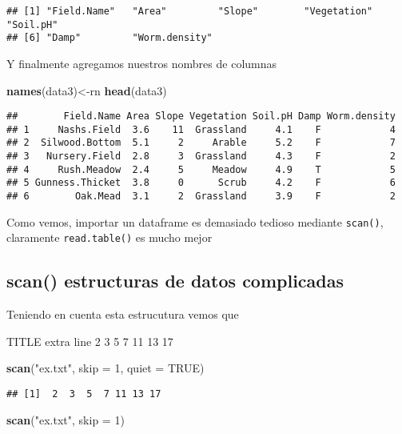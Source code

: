 \documentclass[]{article}
\newenvironment{Shaded}{\begin{snugshade}}{\end{snugshade}}
\newcommand{\KeywordTok}[1]{\textcolor[rgb]{0.13,0.29,0.53}{\textbf{#1}}}
\newcommand{\DataTypeTok}[1]{\textcolor[rgb]{0.13,0.29,0.53}{#1}}
\newcommand{\DecValTok}[1]{\textcolor[rgb]{0.00,0.00,0.81}{#1}}
\newcommand{\StringTok}[1]{\textcolor[rgb]{0.31,0.60,0.02}{#1}}
\newcommand{\OtherTok}[1]{\textcolor[rgb]{0.56,0.35,0.01}{#1}}
\newcommand{\NormalTok}[1]{#1}
\begin{document}
\begin{verbatim}
## [1] "Field.Name"   "Area"         "Slope"        "Vegetation"   "Soil.pH"     
## [6] "Damp"         "Worm.density"
\end{verbatim}

Y finalmente agregamos nuestros nombres de columnas

\begin{Shaded}
\begin{Highlighting}[]
\KeywordTok{names}\NormalTok{(data3)<-rn}
\KeywordTok{head}\NormalTok{(data3)}
\end{Highlighting}
\end{Shaded}

\begin{verbatim}
##        Field.Name Area Slope Vegetation Soil.pH Damp Worm.density
## 1     Nashs.Field  3.6    11  Grassland     4.1    F            4
## 2  Silwood.Bottom  5.1     2     Arable     5.2    F            7
## 3   Nursery.Field  2.8     3  Grassland     4.3    F            2
## 4     Rush.Meadow  2.4     5     Meadow     4.9    T            5
## 5 Gunness.Thicket  3.8     0      Scrub     4.2    F            6
## 6        Oak.Mead  3.1     2  Grassland     3.9    F            2
\end{verbatim}

Como vemos, importar un dataframe es demasiado tedioso mediante
\texttt{scan()}, claramente \texttt{read.table()} es mucho mejor

\subsection{scan() estructuras de datos
complicadas}\label{scan-estructuras-de-datos-complicadas}

Teniendo en cuenta esta estrucutura vemos que

TITLE extra line 2 3 5 7 11 13 17

\begin{Shaded}
\begin{Highlighting}[]
\KeywordTok{scan}\NormalTok{(}\StringTok{"ex.txt"}\NormalTok{, }\DataTypeTok{skip =} \DecValTok{1}\NormalTok{, }\DataTypeTok{quiet =} \OtherTok{TRUE}\NormalTok{)}
\end{Highlighting}
\end{Shaded}

\begin{verbatim}
## [1]  2  3  5  7 11 13 17
\end{verbatim}

\begin{Shaded}
\begin{Highlighting}[]
\KeywordTok{scan}\NormalTok{(}\StringTok{"ex.txt"}\NormalTok{, }\DataTypeTok{skip =} \DecValTok{1}\NormalTok{)}
\end{Highlighting}
\end{Shaded}
\end{document}
